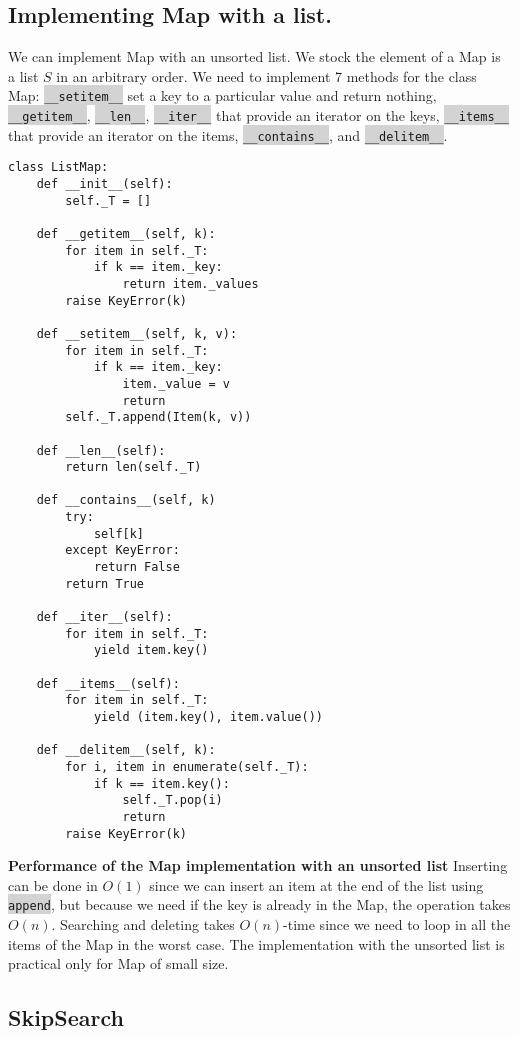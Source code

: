 \documentclass[10pt]{article}
\newcommand{\code}[1]{{\small\colorbox{LightGray}{\texttt{#1}}}}
\begin{document}
\subsection{Implementing Map with a list.}
We can implement Map with an unsorted list. We stock the element of a Map is a list $S$ in an arbitrary order. We need to implement 7 methods for the class Map: \code{\_\_setitem\_\_} set a key to a particular value and return nothing, \code{\_\_getitem\_\_}, \code{\_\_len\_\_}, \code{\_\_iter\_\_} that provide an iterator on the keys, \code{\_\_items\_\_} that provide an iterator on the items, \code{\_\_contains\_\_}, and \code{\_\_delitem\_\_}. 
\begin{verbatim}
class ListMap:
    def __init__(self):
        self._T = []
        
    def __getitem__(self, k):
        for item in self._T:
            if k == item._key:
                return item._values
        raise KeyError(k)
        
    def __setitem__(self, k, v):
        for item in self._T:
            if k == item._key:
                item._value = v
                return
        self._T.append(Item(k, v))
    
    def __len__(self):
        return len(self._T)
        
    def __contains__(self, k)
        try: 
            self[k]
        except KeyError:
            return False
        return True
    
    def __iter__(self):
        for item in self._T:
            yield item.key()
    
    def __items__(self):
        for item in self._T:
            yield (item.key(), item.value())
    
    def __delitem__(self, k):
        for i, item in enumerate(self._T):
            if k == item.key():
                self._T.pop(i)
                return
        raise KeyError(k)    
\end{verbatim}

\textbf{Performance of the Map implementation with an unsorted list} Inserting can be done in $O(1)$ since we can insert an item at the end of the list using \code{append}, but because we need if the key is already in the Map, the operation takes $O(n)$. Searching and deleting takes $O(n)$-time since we need to loop in all the items of the Map in the worst case. The implementation with the unsorted list is practical only for Map of small size.

\subsection{SkipSearch}
\end{document}

